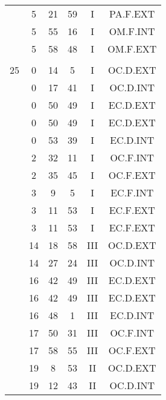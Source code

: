 \documentclass[12pt, a4paper]{article}
\begin{document}
\begin{multicols}{3}
{\begin{tabular}{c c c c c c}
	 	 	 	 & 5 & 21 & 59 & I & PA.F.EXT\\%
	 	 	 	 & 5 & 55 & 16 & I & OM.F.INT\\%
	 	 	 	 & 5 & 58 & 48 & I & OM.F.EXT\\%
	 	 	 	 & & & & & \\%
	 	 	 	25 & 0 & 14 & 5 & I & OC.D.EXT\\%
	 	 	 	 & 0 & 17 & 41 & I & OC.D.INT\\%
	 	 	 	 & 0 & 50 & 49 & I & EC.D.EXT\\%
	 	 	 	 & 0 & 50 & 49 & I & EC.D.EXT\\%
	 	 	 	 & 0 & 53 & 39 & I & EC.D.INT\\%
	 	 	 	 & 2 & 32 & 11 & I & OC.F.INT\\%
	 	 	 	 & 2 & 35 & 45 & I & OC.F.EXT\\%
	 	 	 	 & 3 & 9 & 5 & I & EC.F.INT\\%
	 	 	 	 & 3 & 11 & 53 & I & EC.F.EXT\\%
	 	 	 	 & 3 & 11 & 53 & I & EC.F.EXT\\%
	 	 	 	 & 14 & 18 & 58 & III & OC.D.EXT\\%
	 	 	 	 & 14 & 27 & 24 & III & OC.D.INT\\%
	 	 	 	 & 16 & 42 & 49 & III & EC.D.EXT\\%
	 	 	 	 & 16 & 42 & 49 & III & EC.D.EXT\\%
	 	 	 	 & 16 & 48 & 1 & III & EC.D.INT\\%
	 	 	 	 & 17 & 50 & 31 & III & OC.F.INT\\%
	 	 	 	 & 17 & 58 & 55 & III & OC.F.EXT\\%
	 	 	 	 & 19 & 8 & 53 & II & OC.D.EXT\\%
	 	 	 	 & 19 & 12 & 43 & II & OC.D.INT\\%

\end{tabular}}
\end{multicols}
\end{document}
